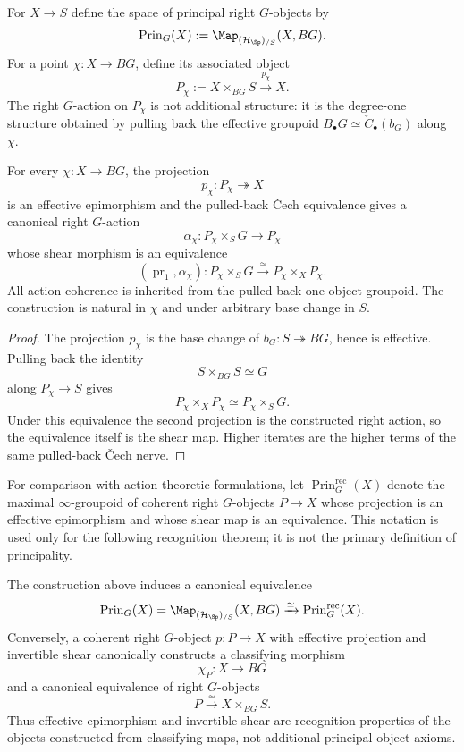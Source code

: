 \begin{definition}
\label{def:principal-object-space}
For $X\to S$ define the space of principal right $G$-objects by
\[
    \operatorname{Prin}_G(X)
    :=
    \Map_{(\mathcal H_{\Sp})_{/S}}(X,BG).
\]
For a point $\chi:X\to BG$, define its associated object
\[
    P_\chi:=X\times_{BG}S
    \xrightarrow{p_\chi}X.
\]
The right $G$-action on $P_\chi$ is not additional structure: it is the
degree-one structure obtained by pulling back the effective groupoid
$B_\bullet G\simeq\check C_\bullet(b_G)$ along $\chi$.
\end{definition}

\begin{proposition}
\label{prop:principal-classifying-map}
For every $\chi:X\to BG$, the projection
\[
    p_\chi:P_\chi\twoheadrightarrow X
\]
is an effective epimorphism and the pulled-back \v{C}ech equivalence gives a
canonical right $G$-action
\[
    \alpha_\chi:P_\chi\times_SG\longrightarrow P_\chi
\]
whose shear morphism is an equivalence
\[
    (\operatorname{pr}_1,\alpha_\chi):
    P_\chi\times_SG
    \xrightarrow{\simeq}
    P_\chi\times_XP_\chi.
\]
All action coherence is inherited from the pulled-back one-object groupoid.
The construction is natural in $\chi$ and under arbitrary base change in
$S$.
\end{proposition}

\begin{proof}
The projection $p_\chi$ is the base change of
$b_G:S\twoheadrightarrow BG$, hence is effective.  Pulling back the
identity
\[
    S\times_{BG}S\simeq G
\]
along $P_\chi\to S$ gives
\[
    P_\chi\times_XP_\chi
    \simeq
    P_\chi\times_SG.
\]
Under this equivalence the second projection is the constructed right action,
so the equivalence itself is the shear map.  Higher iterates are the higher
terms of the same pulled-back \v{C}ech nerve.
\end{proof}

For comparison with action-theoretic formulations, let
$\operatorname{Prin}^{\mathrm{rec}}_G(X)$ denote the maximal
$\infty$-groupoid of coherent right $G$-objects $P\to X$ whose projection is
an effective epimorphism and whose shear map is an equivalence.  This notation
is used only for the following recognition theorem; it is not the primary
definition of principality.

\begin{theorem}
\label{thm:principal-objects-classified-by-bg}
The construction above induces a canonical equivalence
\[
    \operatorname{Prin}_G(X)
    =
    \Map_{(\mathcal H_{\Sp})_{/S}}(X,BG)
    \xrightarrow{\simeq}
    \operatorname{Prin}^{\mathrm{rec}}_G(X).
\]
Conversely, a coherent right $G$-object
$p:P\to X$ with effective projection and invertible shear canonically
constructs a classifying morphism
\[
    \chi_P:X\longrightarrow BG
\]
and a canonical equivalence of right $G$-objects
\[
    P\xrightarrow{\simeq}X\times_{BG}S.
\]
Thus effective epimorphism and invertible shear are recognition properties of
the objects constructed from classifying maps, not additional principal-object
axioms.
\end{theorem}

